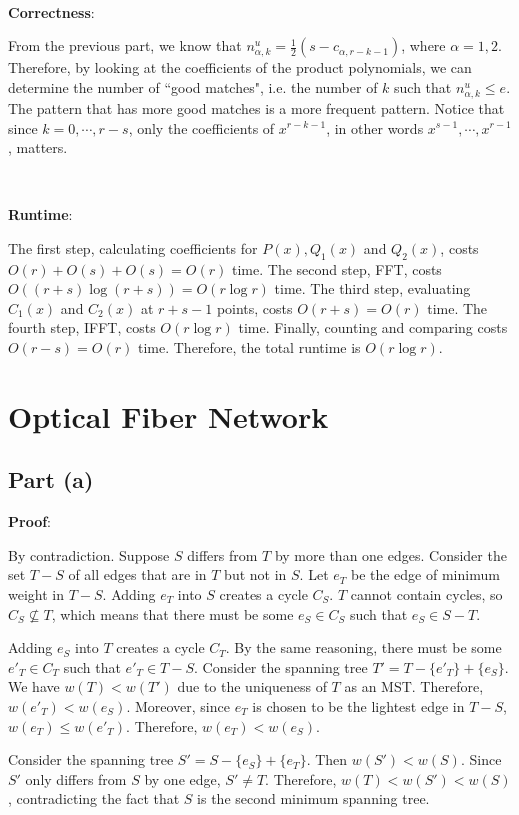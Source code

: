 \documentclass{article}
\begin{document}
~

\noindent\textbf{Correctness}:

From the previous part, we know that $n^u_{\alpha,k}=\frac{1}{2}(s-c_{\alpha,r-k-1})$, where $\alpha=1,2$. Therefore, by looking at the coefficients of the product polynomials, we can determine the number of ``good matches", i.e. the number of $k$ such that $n^u_{\alpha,k}\leqslant e$. The pattern that has more good matches is a more frequent pattern. Notice that since $k=0,\cdots,r-s$, only the coefficients of $x^{r-k-1}$, in other words $x^{s-1},\cdots,x^{r-1}$, matters.

~

\noindent\textbf{Runtime}:

The first step, calculating coefficients for $P(x),Q_1(x)$ and $Q_2(x)$, costs $O(r)+O(s)+O(s)=O(r)$ time. The second step, FFT, costs $O((r+s)\log(r+s))=O(r\log r)$ time. The third step, evaluating $C_1(x)$ and $C_2(x)$ at $r+s-1$ points, costs $O(r+s)=O(r)$ time. The fourth step, IFFT, costs $O(r\log r)$ time. Finally, counting and comparing costs $O(r-s)=O(r)$ time. Therefore, the total runtime is $O(r\log r)$.

\section{Optical Fiber Network}
\subsection{Part (a)}
\noindent\textbf{Proof}:

By contradiction. Suppose $S$ differs from $T$ by more than one edges. Consider the set $T-S$ of all edges that are in $T$ but not in $S$. Let $e_T$ be the edge of minimum weight in $T-S$. Adding $e_T$ into $S$ creates a cycle $C_S$. $T$ cannot contain cycles, so $C_S\not\subseteq T$, which means that there must be some $e_S\in C_S$ such that $e_S\in S-T$.

Adding $e_S$ into $T$ creates a cycle $C_T$. By the same reasoning, there must be some $e'_T\in C_T$ such that $e'_T\in T-S$. Consider the spanning tree $T'=T-\{e'_T\}+\{e_S\}$. We have $w(T)<w(T')$ due to the uniqueness of $T$ as an MST. Therefore, $w(e'_T)<w(e_S)$. Moreover, since $e_T$ is chosen to be the lightest edge in $T-S$, $w(e_T)\leqslant w(e'_T)$. Therefore, $w(e_T)<w(e_S)$.

Consider the spanning tree $S'=S-\{e_S\}+\{e_T\}$. Then $w(S')<w(S)$. Since $S'$ only differs from $S$ by one edge, $S'\neq T$. Therefore, $w(T)<w(S')<w(S)$, contradicting the fact that $S$ is the second minimum spanning tree.
\end{document}
